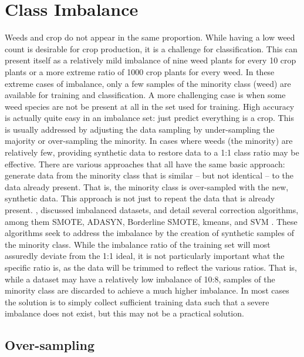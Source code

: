 \documentclass[letterpaper]{report}
\begin{document}
\section{Class Imbalance}
Weeds and crop do not appear in the same proportion. While having a low weed count is desirable for crop production, it is a challenge for classification. This can present itself as a relatively mild imbalance of nine weed plants for every 10 crop plants or a more extreme ratio of 1000 crop plants for every weed. In these extreme cases of imbalance, only a few samples of the minority class (weed) are available for training and classification. A more challenging case is when some weed species are not be present at all in the set used for training.  High accuracy is actually quite easy in an imbalance set: just predict everything is a crop. This is usually addressed by adjusting the data sampling by under-sampling the majority or over-sampling the minority. In cases where weeds (the minority) are relatively few, providing synthetic data to restore data to a 1:1 class ratio may be effective. There are various approaches that all have the same basic approach: generate data from the minority class that is similar -- but not identical -- to the data already present. That is, the minority class is over-sampled with the new, synthetic data. This approach is not just to repeat the data that is already present. \citeauthor{Fernandez2018-fw}, discussed imbalanced datasets, and detail several correction algorithms, among them SMOTE, ADASYN, Borderline SMOTE, kmeans, and SVM \parencite{Fernandez2018-fw}. These algorithms seek to address the imbalance by the creation of synthetic samples of the minority class. While the imbalance ratio of the training set will most assuredly deviate from the 1:1 ideal, it is not particularly important what the specific ratio is, as the data will be trimmed to reflect the various ratios. That is, while a dataset may have a relatively low imbalance of 10:8, samples of the minority class are discarded to achieve a much higher imbalance. In most cases the solution is to simply collect sufficient training data such that a severe imbalance does not exist, but this may not be a practical solution. 
\subsection{Over-sampling}
\label{section:over}
\end{document}
